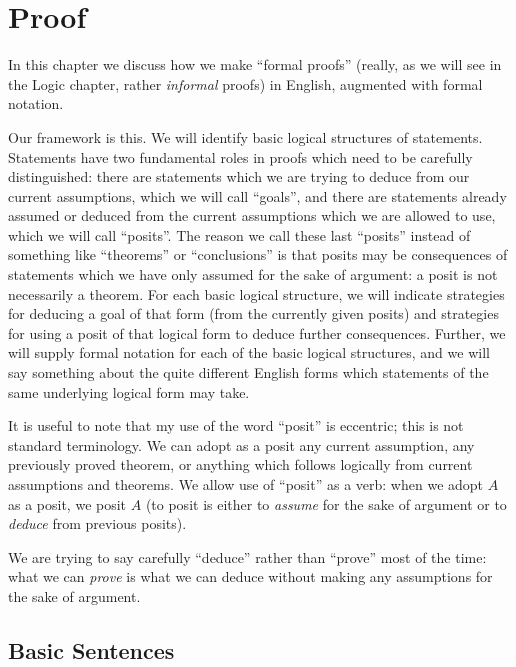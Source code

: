 \documentclass[12pt]{book}
\begin{document}
\newpage

\chapter{Proof}

In this chapter we discuss how we make ``formal proofs'' (really, as
we will see in the Logic chapter, rather {\em informal\/} proofs) in
English, augmented with formal notation.

Our framework is this.  We will identify basic logical structures of
statements.  Statements have two fundamental roles in proofs which
need to be carefully distinguished: there are statements which we are
trying to deduce from our current assumptions, which we will call
``goals'', and there are statements already assumed or deduced from
the current assumptions which we are allowed to use, which we will
call ``posits''.  The reason we call these last ``posits'' instead of
something like ``theorems'' or ``conclusions'' is that posits may be
consequences of statements which we have only assumed for the sake of
argument: a posit is not necessarily a theorem.  For each basic
logical structure, we will indicate strategies for deducing a goal of
that form (from the currently given posits) and strategies for using a
posit of that logical form to deduce further consequences.  Further,
we will supply formal notation for each of the basic logical
structures, and we will say something about the quite different
English forms which statements of the same underlying logical form may
take.

It is useful to note that my use of the word ``posit'' is eccentric;
this is not standard terminology.  We can adopt as a posit any current
assumption, any previously proved theorem, or anything which follows
logically from current assumptions and theorems.  We allow use of
``posit'' as a verb: when we adopt $A$ as a posit, we posit $A$ (to
posit is either to {\em assume\/} for the sake of argument or to
{\em deduce\/} from previous posits).

We are trying to say carefully ``deduce'' rather than ``prove'' most
of the time: what we can {\em prove\/} is what we can deduce without
making any assumptions for the sake of argument.

\section{Basic Sentences}
\end{document}

